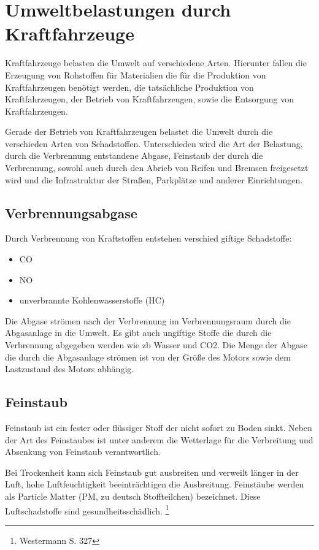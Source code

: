 \section{Umweltbelastungen durch Kraftfahrzeuge}
Kraftfahrzeuge belasten die Umwelt auf verschiedene Arten.
Hierunter fallen
die Erzeugung von Rohstoffen für Materialien die für die Produktion von Kraftfahrzeugen benötigt werden,
die tatsächliche Produktion von Kraftfahrzeugen,
der Betrieb von Kraftfahrzeugen,
sowie die Entsorgung von Kraftfahrzeugen.

Gerade der Betrieb von Kraftfahrzeugen belastet die Umwelt durch die verschieden Arten von Schadstoffen.
Unterschieden wird die Art der Belastung,
durch die Verbrennung entstandene Abgase,
Feinstaub der durch die Verbrennung, sowohl auch durch den Abrieb von Reifen und Bremsen freigesetzt wird
und die Infrastruktur der Straßen, Parkplätze und anderer Einrichtungen.

\subsection{Verbrennungsabgase}
Durch Verbrennung von Kraftstoffen entstehen verschied giftige Schadstoffe:
\begin{itemize}
	\item {\ac{CO}}
	\item {\ac{NO}}
	\item unverbrannte Kohlenwasserstoffe (HC)
\end{itemize}
Die Abgase strömen nach der Verbrennung im Verbrennungsraum durch die Abgasanlage in die Umwelt.
Es gibt auch ungiftige Stoffe die durch die Verbrennung abgegeben werden wie \ac{zb} \ac{Wasser} und \ac{CO2}.
Die Menge der Abgase die durch die Abgasanlage strömen ist von der Größe des Motors sowie dem Lastzustand des Motors abhängig.

\subsection{Feinstaub}
Feinstaub ist ein fester oder flüssiger Stoff der nicht sofort zu Boden sinkt.
Neben der Art des Feinstaubes ist unter anderem die Wetterlage für die Verbreitung und Absenkung von Feinstaub verantwortlich.

Bei Trockenheit kann sich Feinstaub gut ausbreiten und verweilt länger in der Luft, hohe Luftfeuchtigkeit beeinträchtigen die Ausbreitung.
Feinstäube werden als Particle Matter (PM, zu deutsch Stoffteilchen) bezeichnet. Diese Luftschadstoffe sind gesundheitsschädlich. \footnote{Westermann S. 327}

